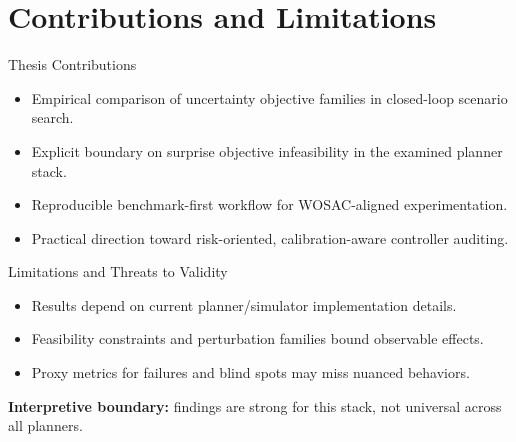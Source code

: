 \section{Contributions and Limitations}

\begin{frame}{Thesis Contributions}
\begin{itemize}
    \item Empirical comparison of uncertainty objective families in closed-loop scenario search.
    \item Explicit boundary on surprise objective infeasibility in the examined planner stack.
    \item Reproducible benchmark-first workflow for WOSAC-aligned experimentation.
    \item Practical direction toward risk-oriented, calibration-aware controller auditing.
\end{itemize}
\end{frame}

\begin{frame}{Limitations and Threats to Validity}
\begin{itemize}
    \item Results depend on current planner/simulator implementation details.
    \item Feasibility constraints and perturbation families bound observable effects.
    \item Proxy metrics for failures and blind spots may miss nuanced behaviors.
\end{itemize}
\vspace{0.4em}
\textbf{Interpretive boundary:} findings are strong for this stack, not universal across all planners.
\end{frame}
